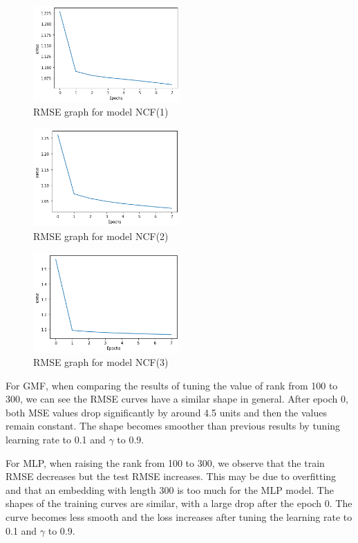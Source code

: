 \documentclass[final]{cvpr}
\begin{document}
\begin{figure}
	\includegraphics[width=0.5\textwidth]{ncf_1.png}
	\caption{RMSE graph for model NCF(1)}
\end{figure}

\begin{figure}
	\includegraphics[width=0.5\textwidth]{ncf_2.png}
	\caption{RMSE graph for model NCF(2)}
\end{figure}

\begin{figure}
	\includegraphics[width=0.5\textwidth]{ncf_3.png}
	\caption{RMSE graph for model NCF(3)}
\end{figure}

\hspace{10em}

For GMF, when comparing the results of tuning the value of rank from 100 to 300, we can see the RMSE curves have a similar shape in general. After epoch 0, both MSE values drop significantly by around 4.5 units and then the values remain constant. The shape becomes smoother than previous results by tuning learning rate to 0.1 and $\gamma$ to 0.9. 

For MLP, when raising the rank from 100 to 300, we observe that the train RMSE decreases but the test RMSE increases. This may be due to overfitting and that an embedding with length 300 is too much for the MLP model. The shapes of the training curves are similar, with a large drop after the epoch 0. The curve becomes less smooth and the loss increases after tuning the learning rate to 0.1 and $\gamma$ to 0.9.
\end{document}
